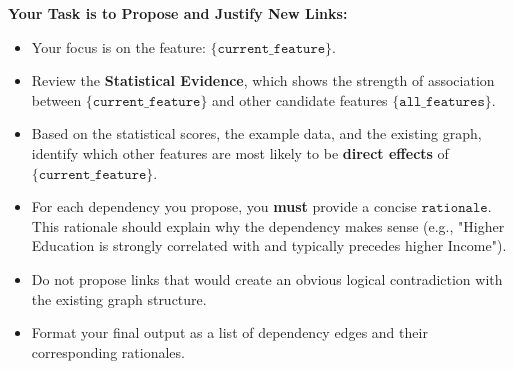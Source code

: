 \begin{tcolorbox}
\textbf{Your Task is to Propose and Justify New Links:}
\begin{itemize}[leftmargin=*, itemsep=2pt]
    \item Your focus is on the feature: $\texttt{\{current\_feature}\}$.
    \item Review the \textbf{Statistical Evidence}, which shows the strength of association between $\texttt{\{current\_feature\}}$ and other candidate features $\texttt{\{all\_features\}}$.
    \item Based on the statistical scores, the example data, and the existing graph, identify which other features are most likely to be \textbf{direct effects} of $\texttt{\{current\_feature\}}$.
    \item For each dependency you propose, you \textbf{must} provide a concise $\texttt{rationale}$. This rationale should explain why the dependency makes sense (e.g., "Higher Education is strongly correlated with and typically precedes higher Income").
    \item Do not propose links that would create an obvious logical contradiction with the existing graph structure.
    \item Format your final output as a list of dependency edges and their corresponding rationales.
\end{itemize}

\label{prompt:generation}
\end{tcolorbox}

